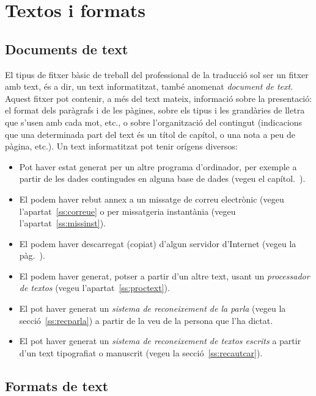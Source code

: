 \chapter{Textos i formats}
\label{se:EPT}

\section{Documents de text}

El tipus de fitxer bàsic de treball del professional de la traducció
sol ser un fitxer amb text, és a dir, un text informatitzat, també
anomenat \emph{document de text}. Aquest fitxer pot contenir, a més
del text mateix, informació sobre la presentació: el format dels
paràgrafs i de les pàgines, sobre els tipus i les grandàries de lletra
que s'usen amb cada mot, etc., o sobre l'organització del contingut
(indicacions que una determinada part del text és un títol de capítol,
o una nota a peu de pàgina, etc.).  Un text informatitzat pot tenir
orígens diversos:
\begin{itemize}
\item Pot haver estat generat per un altre programa d'ordinador, per
  exemple a partir de les dades contingudes en alguna base de dades
  (vegeu el capítol.~\pageref{se:basesdades}).
\item El podem haver rebut annex a un missatge de correu electrònic
  (vegeu l'apartat~\ref{ss:correue} o per missatgeria instantània
  (vegeu l'apartat~\ref{ss:missinst}).
\item El podem haver descarregat (copiat) d'algun servidor d'Internet
  (vegeu la pàg.~\pageref{pg:ftp}).
\item El podem haver generat, potser a partir d'un altre
  text, usant un \emph{processador de textos} (vegeu
  l'apartat~\ref{ss:proctext}).
\item El pot haver generat un \emph{sistema de reconeixement de la
    parla} (vegeu la secció~\ref{ss:recparla}) a partir de la veu de
  la persona que l'ha dictat.
\item El pot haver generat un \emph{sistema de reconeixement de textos
    escrits} a partir d'un text tipografiat o manuscrit (vegeu la
  secció~\ref{ss:recautcar}).
\end{itemize}

\section{Formats de text}
\label{ss:formats}

